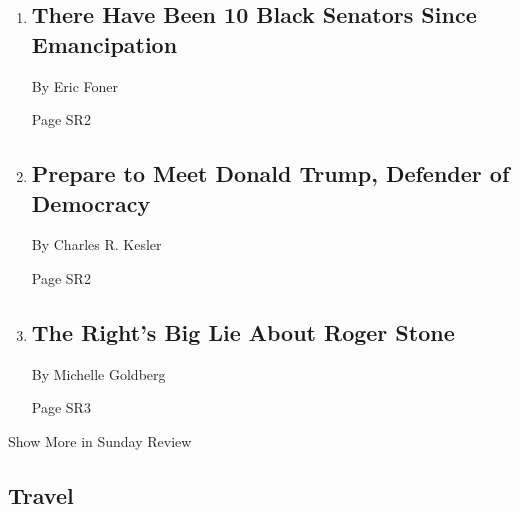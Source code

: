 \begin{enumerate}
\def\labelenumi{\arabic{enumi}.}
\item
  \href{/2020/02/14/opinion/sunday/hiram-revels-reconstruction-150.html}{}

  \hypertarget{there-have-been-10-black-senators-since-emancipation}{%
  \subsection{There Have Been 10 Black Senators Since
  Emancipation}\label{there-have-been-10-black-senators-since-emancipation}}

  By Eric Foner

  Page SR2
\item
  \href{/2020/02/13/opinion/trump-impeachment-election.html}{}

  \hypertarget{prepare-to-meet-donald-trump-defender-of-democracy}{%
  \subsection{Prepare to Meet Donald Trump, Defender of
  Democracy}\label{prepare-to-meet-donald-trump-defender-of-democracy}}

  By Charles R. Kesler

  Page SR2
\item
  \href{/2020/02/14/opinion/roger-stone-randy-credico.html}{}

  \hypertarget{the-rights-big-lie-about-roger-stone}{%
  \subsection{The Right's Big Lie About Roger
  Stone}\label{the-rights-big-lie-about-roger-stone}}

  By Michelle Goldberg

  Page SR3
\end{enumerate}

Show More in Sunday Review

\hypertarget{travel}{%
\subsection{Travel}\label{travel}}

